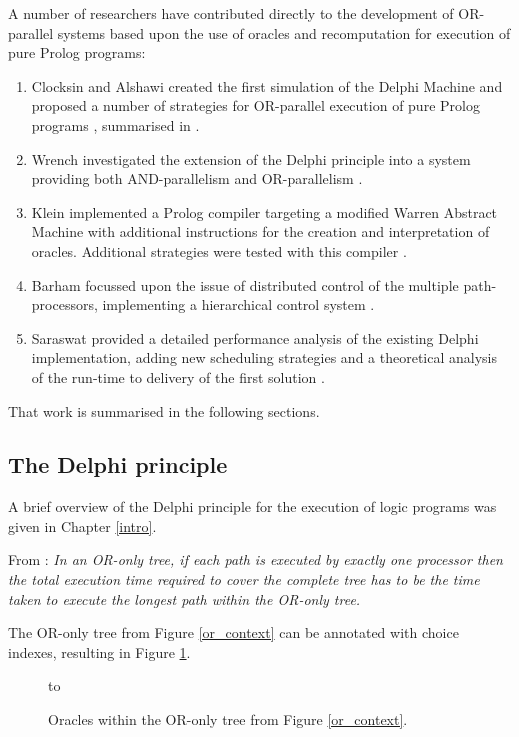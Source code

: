 A number of researchers have contributed directly to the development of OR-parallel
systems
based upon the use of oracles and recomputation
for execution of pure Prolog
programs:
\begin{enumerate}
\item{Clocksin and Alshawi created the first simulation of the Delphi
  Machine and proposed a number of strategies for OR-parallel execution of pure
  Prolog programs \cite{CA87}, summarised in \cite{Clo92}.}
\item{Wrench investigated the extension of the Delphi principle into a
  system providing both AND-parallelism and OR-parallelism \cite{Wre90}.}
\item{Klein implemented a Prolog compiler targeting a modified
  Warren Abstract Machine \cite{AK90} with additional instructions for the creation and
  interpretation of oracles.  Additional strategies were tested with this compiler \cite{Kle91}.}
\item{Barham focussed upon the issue of distributed control of the
  multiple path-processors, implementing a hierarchical control system \cite{Bar92}.}
\item{Saraswat provided a detailed performance analysis of the
  existing Delphi implementation, adding new scheduling strategies and a 
  theoretical analysis of the run-time to delivery of the first solution \cite{Sar95}.}
\end{enumerate}

That work is summarised in the following sections.

\subsection{The Delphi principle}

A brief overview of the Delphi principle for the execution of logic programs was
given in Chapter \ref{intro}.

From \cite{Sar95}: \textit{In an OR-only tree, if each path is executed by
exactly one processor then the total execution time required to cover the complete
tree has to be the time taken to execute the longest path within the OR-only tree.}

The OR-only tree from Figure \ref{or_context} can be annotated with choice indexes, resulting
in Figure \ref{orc_tree}.

\begin{figure}[h]
\vspace{5mm} \hbox to 
\caption{Oracles within the OR-only tree from Figure \ref{or_context}.}
\vspace{5mm}
\label{orc_tree}
\end{figure}

